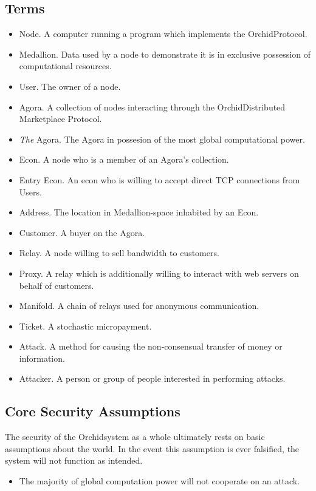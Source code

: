 \documentclass{article}
\newcommand{\orchid}{Orchid}
\newcommand{\Orchid}{\orchid}
\begin{document}
\subsection{Terms}

\begin{itemize}
\item Node. A computer running a program which implements the \Orchid Protocol.
\item Medallion. Data used by a node to demonstrate it is in exclusive possession of computational resources.
\item User. The owner of a node.
\item Agora. A collection of nodes interacting through the \Orchid Distributed Marketplace Protocol.
\item \emph{The} Agora. The Agora in possesion of the most global computational power.
\item Econ. A node who is a member of an Agora's collection.
\item Entry Econ. An econ who is willing to accept direct TCP connections from Users.
\item Address. The location in Medallion-space inhabited by an Econ.
\item Customer. A buyer on the Agora.
\item Relay. A node willing to sell bandwidth to customers.
\item Proxy. A relay which is additionally willing to interact with web servers on behalf of customers.
\item Manifold. A chain of relays used for anonymous communication.
\item Ticket. A stochastic micropayment.
\item Attack. A method for causing the non-consensual transfer of money or information.
\item Attacker. A person or group of people interested in performing attacks.
\end{itemize}

\subsection{Core Security Assumptions}
\label{core-security}

The security of the \Orchid system as a whole ultimately rests on basic assumptions about the world. In the event this assumption is ever falsified, the system will not function as intended.

\begin{itemize}
\item The majority of global computation power will not cooperate on an attack.
\end{itemize}
\end{document}
